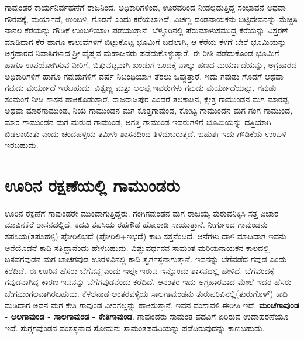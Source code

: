 ಗಾವುಂಡರ ಕಾರ್ಯನಿರ್ವಹಣೆಗೆ ರಾಜನಿಂದ, ಅಧಿಕಾರಿಗಳಿಂದ, ಊರವರಿಂದ ನೀಡಲ್ಪಡುತ್ತಿದ್ದ ಸಂಭಾವನೆ ಅಥವಾ ಗೌರವಕ್ಕೆ, ಮರ್ಯಾದೆ, ಉಂಬಳಿ, ಗೊಡಗೆ ಎಂದು ಕರೆಯಲಾಗಿದೆ. ಏಚಣ್ಣ ದಂಡನಾಯಕನು ಬಿಟ್ಟಿದೇವನನ್ನು ಮೆಚ್ಚಿಸಿ ನಾನಲ ಕೆರೆಯನ್ನು ಗೌಡಿಕೆ ಉಂಬಳಿಯಾಗಿ ಪಡೆಯುತ್ತಾನೆ. ಬೆಳ್ಳೂರಿನಲ್ಲಿ ಪೆರುಮಾಳುಸಮುದ್ರ ಕೆರೆಯನ್ನು ವಿಸ್ತರಣೆ ಮಾಡಿದಾಗ ಕೆರೆ ಹಾಗೂ ಕಾಲುವೆಗಳಿಗೆ ಬಿಟ್ಟುಕೊಟ್ಟ ಭೂಮಿಗೆ ಬದಲಾಗಿ, ಆ ಕೆರೆಯ ಕೆಳಗೆ ಬೇರೆ ಭೂಮಿಯನ್ನು ಅಗ್ರಹಾರದ ನಿವಾಸಿಗಳಾದ ಶ‍್ರೀ ವೈಷ್ಣವ ಮಹಾಜನರು ಪಡೆದುಕೊಳ್ಳುತ್ತಾರೆ. ಈ ರೀತಿ ಪಡೆದುಕೊಂಡ ಭೂಮಿಗೆ ಹಾಗೂ ಉಪಯೋಗಿಸುವ ನೀರಿಗೆ, ಬಿತ್ತುವಟ್ಟವಾಗಿ ಖಂಡುಗ ಒಂದಕ್ಕೆ ನಾಲ್ಕು ಹಣದ ಮರ್ಯಾದೆಯನ್ನು, ಅಗ್ರಹಾರದ ಅಧಿಕಾರಿಗಳಿಗೆ ಹಾಗೂ ಗವುಡುಗಳಿಗೆ ವರ್ಷ ನಿಬಂಧಿಯಾಗಿ ತೆರಲು ಒಪ್ಪುತ್ತಾರೆ. ಇದು ಗವುಡು ಗೊಡಗೆ ಆಥವಾ ಗವುಡು ಮರ್ಯಾದೆ ಇರಬಹುದು. ವಿಶ್ವಣ್ಣ ಮತ್ತು ಆಲಪ್ಪ ಇವರುಗಳು ಗವುಡು ಮರ್ಯಾದೆಯನ್ನು, ಗವುಡು ತಂಮಂಗೆ ನೀಡಿ ಶಾಸನ ಹಾಕಿಕೊಡುತ್ತಾರೆ. ರಾಜರಾಜಪುರ ಎಂದರೆ ತಲಕಾಡಿನ, ಕ್ಷೇತ್ರ ಗಾಮುಂಡನ ಮಗ ಮಾರಪ್ಪ ಅಥವಾ ಮಾರಗಾಮುಂಡ, ನಿಯ ಗಾಮುಂಡನ ಮಗ ಕೂತ್ತಗಾವುಂಡ, ಕೋಟ್ಟ ಗಾಮುಂಡನ ಮಗ ಗಂಗ ಗಾಮುಂಡ, ಮಾರ ಗಾಮುಂಡನ ಮಗ ಮರುದ ಗಾಮುಂಡ, ಅಗತ್ತಿ ಗಾಮುಂಡ ಇವರುಗಳಿಗೆ ಭೂಮಿಯನ್ನು ದತ್ತಿಯಾಗಿ ಬಿಡಲಾಯಿತು ಎಂದು ಚಂದಹಳ್ಳಿಯ ತಮಿಳು ಶಾಸನದಿಂದ ತಿಳಿದುಬರುತ್ತದೆ. ಬಹುಶಃ ಇದು ಗೌಡಿಕೆಯ ಉಂಬಳಿ ಇರಬಹುದು.


\section{ಊರಿನ ರಕ್ಷಣೆಯಲ್ಲಿ ಗಾಮುಂಡರು}

ಊರಿನ ರಕ್ಷಣೆಗೆ ಗಾವುಂಡರೇ ಮುಂದಾಗುತ್ತಿದ್ದರು. ಗಂಗಿಗವುಂಡನ ಮಗ ರಾಜಯ್ಯ ತುರುವನಿಕ್ಕಿಸಿ ಸತ್ತ ವಿಚಾರ ಮಾವಿನಕೆರೆ ಶಾಸನದಲ್ಲಿದೆ. ಕದವಿ ತಪಸಿಯ ರಹಗೌಡ ಹೋರಾಡಿ ಸಾಯುತ್ತಾನೆ. ನೀರ್ಗುಂದ ಗಾವುಂಡನು ತಪಸಿಯ(ತಪಸಿಹಳ್ಳಿ) ಪೋರಿಲಿಭದೆ (ಪೋರಿಲಿ+ಇಭದೆ) ಕಾದಿ ಸತ್ತನೆಂದಿದೆ. ಆನೆಗಳು ದಾಳಿ ಮಾಡಿದಾಗ ಇವನು ಆನೆಯೊಡನೆ ಕಾದಿ ಸತ್ತಿದ್ದಾನೆಂದು ಹೇಳಬಹುದು. ವಿಷ್ಣುವರ್ಧನನ ಸಾಮಂತ ಮರಿಯನಾಯಕನ ಕಾಲದಲ್ಲಿ ಬಸವಗವುಡನ ಮಗ ಬಾಚಗವುಡ ಊರಳಿವಿನಲ್ಲಿ ಕಾದಿ ಸ್ವರ್ಗಸ್ಥನಾಗುತ್ತಾನೆ. ಇವನನ್ನು ಬೆಗೆವಡೆದ ಗವುಡ ಎಂದು ಕರೆದಿದೆ. ಈ ಊರಿನ ಹೆಸರು ಬೆಗೆವನ್ದ ಎಂದು ಇಲ್ಲೇ ಇರುವ ಇನ್ನೊಂದು ಶಾಸನದಲ್ಲಿ ಹೇಳಿದೆ. ಬೆಗೆವಂದಕ್ಕೆ ಗವುಡನಾಗಿದ್ದ ಕಾರಣ ಇವನನ್ನು ಬೆಗೆಗವುಡನೆಂದು ಕರೆದಿದೆ. ಆನಂತರ ಇದು ಅಗ್ರಹಾರವಾದ ಮೇಲೆ ಇದರ ಹೆಸರು ಬೇಗಮಂಗಲವಾಗಿರಬಹುದು. ಕೆಳಲೆನಾಡ ಅಂತರವಳ್ಳಿಯ ಸಾಲಗಾವುಂಡನು ತುರುಪರಿವಿನಲ್ಲಿ(ತುರುಗೊಳ್​) ಕಾದಿ ಮಡಿದಾಗ ಅವನ ಮಗ ಕೇತಿ ಗಾವುಂಡ ವೀರಗಲ್ಲನ್ನು ಹಾಕಿಸುತ್ತಾನೆ. ಇವನ ವಂಶಾವಳಿ ಈರೀತಿ ಇದೆ. \textbf{ಮಂಚೆಗಾವುಂಡ - ಆಲಗಾವುಂಡ - ಸಾಲಗಾವುಂಡ - ಕೇತಿಗಾವುಂಡ}. ಗಾವುಂಡರು ಸಾಮಂತ ಪದವಿಗೆ ಏರಿರುವ ಉದಾಹರಣೆಯೂ ಇದೆ. ಸುಗ್ಗಗವುಂಡನ ವಂಶಸ್ಥನಾದ ಸೋಮನು ಸಾಮಂತಪದವಿಯನ್ನು ಪಡೆದಿರುವುದನ್ನು ಕಾಣಬಹುದು.


